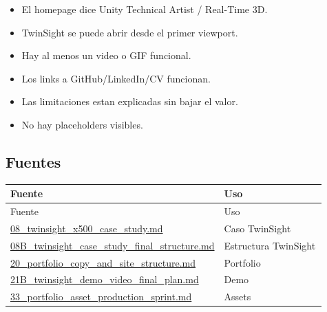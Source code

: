 \begin{itemize}
\item El homepage dice Unity Technical Artist / Real-Time 3D.
\item TwinSight se puede abrir desde el primer viewport.
\item Hay al menos un video o GIF funcional.
\item Los links a GitHub/LinkedIn/CV funcionan.
\item Las limitaciones estan explicadas sin bajar el valor.
\item No hay placeholders visibles.
\end{itemize}


\subsection{Fuentes}


\begin{center}
\scriptsize
\begin{longtable}{>{\raggedright\arraybackslash}p{0.455\linewidth} >{\raggedright\arraybackslash}p{0.455\linewidth}}
\toprule
Fuente & Uso \\
\midrule
\endfirsthead
\toprule
Fuente & Uso \\
\midrule
\endhead
\href{file:///E:/Laboral/08_twinsight_x500_case_study.md}{08\_twinsight\_x500\_case\_study.md} & Caso TwinSight \\
\href{file:///E:/Laboral/08B_twinsight_case_study_final_structure.md}{08B\_twinsight\_case\_study\_final\_structure.md} & Estructura TwinSight \\
\href{file:///E:/Laboral/20_portfolio_copy_and_site_structure.md}{20\_portfolio\_copy\_and\_site\_structure.md} & Portfolio \\
\href{file:///E:/Laboral/21B_twinsight_demo_video_final_plan.md}{21B\_twinsight\_demo\_video\_final\_plan.md} & Demo \\
\href{file:///E:/Laboral/33_portfolio_asset_production_sprint.md}{33\_portfolio\_asset\_production\_sprint.md} & Assets \\
\bottomrule
\end{longtable}
\end{center}
